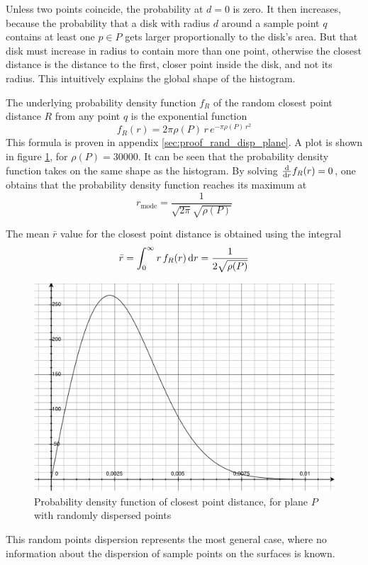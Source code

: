 Unless two points coincide, the probability at $d = 0$ is zero. It then increases, because the probability that a disk with radius $d$ around a sample point $q$ contains at least one $p \in P$ gets larger proportionally to the disk's area. But that disk must increase in radius to contain more than one point, otherwise the closest distance is the distance to the first, closer point inside the disk, and not its radius. This intuitively explains the global shape of the histogram.

The underlying probability density function $f_R$ of the random closest point distance $R$ from any point $q$ is the exponential function
\begin{equation}
f_R(r) = 2 \pi \rho(P) \, r \, e^{-\pi \rho(P) \, r^2}
\end{equation}
This formula is proven in appendix \ref{sec:proof_rand_disp_plane}. A plot is shown in figure \ref{fig:plane_rand_d}, for $\rho(P) = 30000$. It can be seen that the probability density function takes on the same shape as the histogram. By solving $\frac{\mathrm{d}}{\mathrm{d} r} f_R(r) = 0$, one obtains that the probability density function reaches its maximum at
\begin{equation}
r_{\text{mode}} = \frac{1}{\sqrt{2 \pi} \sqrt{\rho(P)}}
\end{equation}

The mean $\bar{r}$ value for the closest point distance is obtained using the integral
\begin{equation}
\bar{r} = \int_{0}^{\infty} r \, f_R(r) \, \mathrm{d} r = \frac{1}{2 \sqrt{\rho(P)}}
\end{equation}

\begin{figure}[p]
\centering
\includegraphics[width=.5\textwidth]{fig/plane_rand_d.pdf}
\caption{Probability density function of closest point distance, for plane $P$ with randomly dispersed points}
\label{fig:plane_rand_d}
\end{figure}

This random points dispersion represents the most general case, where no information about the dispersion of sample points on the surfaces is known. 



